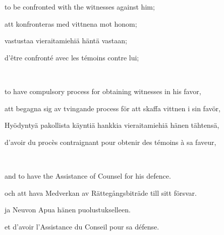 \documentclass[a4,landscape,12pt]{article}
\begin{document}
\begin{minipage}[t]{0.22\textwidth}
to be confronted with the witnesses against him;
\end{minipage}\textwidth
\begin{minipage}[t]{0.22\textwidth}
att konfronteras med vittnena mot honom;	
\end{minipage}\textwidth
\begin{minipage}[t]{0.22\textwidth}
vastustaa vieraitamiehiä häntä vastaan;
\end{minipage}\textwidth
\begin{minipage}[t]{0.22\textwidth}
d'être confronté avec les témoins contre lui;
\end{minipage}

~

\begin{minipage}[t]{0.22\textwidth}
to have compulsory process for obtaining witnesses in his favor, 
\end{minipage}\textwidth
\begin{minipage}[t]{0.22\textwidth}
att begagna sig av tvingande process för att skaffa vittnen i sin favör,
\end{minipage}\textwidth
\begin{minipage}[t]{0.22\textwidth}
Hyödyntyä pakollista käyntiä hankkia vieraitamiehiä hänen tähtensä, 
\end{minipage}\textwidth
\begin{minipage}[t]{0.22\textwidth}
	d'avoir du procès contraignant pour obtenir des témoins à sa faveur,
\end{minipage}

~

\begin{minipage}[t]{0.22\textwidth}
and to have the Assistance of Counsel for his defence.
\end{minipage}\textwidth
\begin{minipage}[t]{0.22\textwidth}
och att hava Medverkan av Rättegångsbiträde till sitt försvar.
\end{minipage}\textwidth
\begin{minipage}[t]{0.22\textwidth}
ja Neuvon Apua hänen puolustukselleen.
\end{minipage}\textwidth
\begin{minipage}[t]{0.22\textwidth}
	et d'avoir l'Assistance du Conseil pour sa défense.
\end{minipage}
\end{document}
